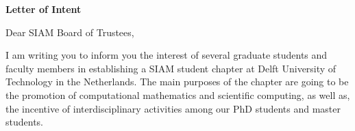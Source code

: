 \documentclass[letterpaper,12pt]{letter}
\begin{document}
\begin{letter}{\textbf{Letter of Intent}}

\opening{Dear SIAM Board of Trustees,}

I am writing you to inform you the interest of several graduate students and faculty members
in establishing a SIAM student chapter at Delft University of Technology in the Netherlands. 
The main purposes of the chapter are going to be the promotion of computational mathematics and scientific computing, 
as well as, the incentive of interdisciplinary activities among our PhD students and master students. 



\end{letter}
\end{document}
